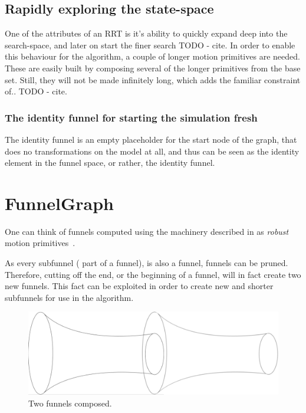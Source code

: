 \subsection{Rapidly exploring the state-space}

One of the attributes of an \ac{RRT} is it's ability to quickly expand deep into
the search-space, and later on start the finer search TODO - cite. In order to
enable this behaviour for the \rrtfunnel{} algorithm, a couple of longer motion
primitives are needed. These are easily built by composing several of the longer
primitives from the base set. Still, they will not be made infinitely long,
which adds the familiar constraint of.. TODO - cite.

\subsubsection{The identity funnel for starting the simulation fresh}

The identity funnel is an empty placeholder for the start node of the graph,
that does no transformations on the model at all, and thus can be seen as the
identity element in the funnel space, or rather, the identity funnel.

\section{FunnelGraph}

One can think of funnels computed using the machinery described in
\cite[sec~4]{majumdarFunnelLibrariesRealtime2017} as \textit{robust} motion
primitives~\cite{majumdarFunnelLibrariesRealtime2017}.

As every subfunnel (\ie{} part of a funnel), is also a funnel, funnels can be
pruned. Therefore, cutting off the end, or the beginning of a funnel, will in
fact create two new funnels. This fact can be exploited in order to create new
and shorter subfunnels for use in the \rrtfunnel{} algorithm.

\begin{figure}
  \includegraphics[scale=.2]{figures/method/funnel-composition}
  \centering
  \caption{Two funnels composed.}
\end{figure}

